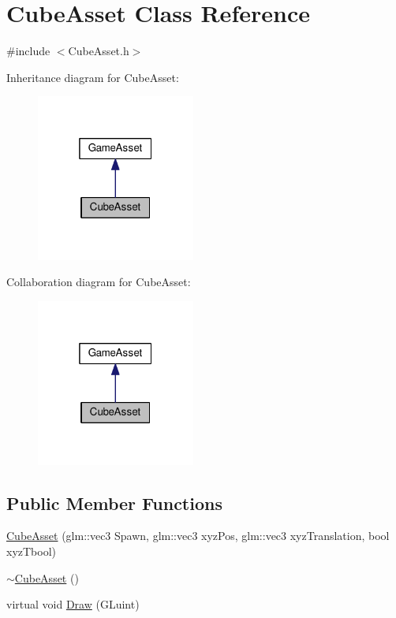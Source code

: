 \hypertarget{class_cube_asset}{}\section{Cube\+Asset Class Reference}
\label{class_cube_asset}


{\ttfamily \#include $<$Cube\+Asset.\+h$>$}



Inheritance diagram for Cube\+Asset\+:
\nopagebreak
\begin{figure}[H]
\begin{center}
\leavevmode
\includegraphics[width=148pt]{class_cube_asset__inherit__graph}
\end{center}
\end{figure}


Collaboration diagram for Cube\+Asset\+:
\nopagebreak
\begin{figure}[H]
\begin{center}
\leavevmode
\includegraphics[width=148pt]{class_cube_asset__coll__graph}
\end{center}
\end{figure}
\subsection*{Public Member Functions}
\begin{DoxyCompactItemize}
\item 
\hyperlink{class_cube_asset_a0e4fb8ef862794c7c86e8dbfc5f39b59}{Cube\+Asset} (glm\+::vec3 Spawn, glm\+::vec3 xyz\+Pos, glm\+::vec3 xyz\+Translation, bool xyz\+Tbool)
\item 
\hyperlink{class_cube_asset_ab3ab9a5da82cbf8537a28652410093b1}{$\sim$\+Cube\+Asset} ()
\item 
virtual void \hyperlink{class_cube_asset_a1af568486056e254ffcf98fd99947bfe}{Draw} (G\+Luint)
\end{DoxyCompactItemize}


